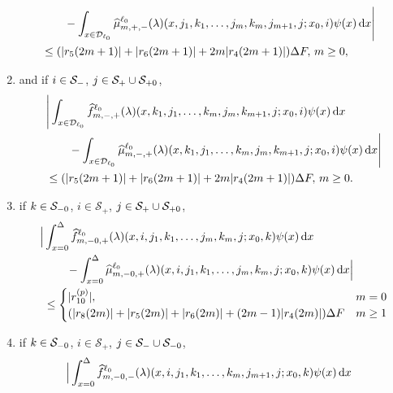 \begin{cor}
\begin{enumerate}
\begin{align}
	\\&\qquad{}- \int_{x\in\mathcal{D}_{\ell_0}}\widehat \mu^{\ell_0}_{m,+,-}(\lambda)(x,j_1,k_1,\dots,j_m,k_m,j_{m+1},j; x_0,i)\psi(x)\, \mathrm{d} x\Bigg| \nonumber
                	\\&\leq 
			(|r_5(2m+1)| + |r_6(2m+1)| + 2m|r_4(2m+1)|)\Delta F ,\,   m\geq 0,\label{eqn: +-}
	\end{align}
	\item and if \(i\in\mathcal{S}_{-}\), \(j\in\mathcal{S}_+\cup\mathcal{S}_{+0}\),
	\begin{align}
                	&\Bigg|\int_{x\in\mathcal{D}_{\ell_0}}\widehat f^{\ell_0}_{m,-,+}(\lambda)(x,k_1,j_1,\dots,k_m,j_m,k_{m+1},j; x_0,i)\psi(x)\, \mathrm{d} x \nonumber
	\\&\qquad{} - \int_{x\in\mathcal{D}_{\ell_0}}\widehat \mu^{\ell_0}_{m,-,+}(\lambda)(x,k_1,j_1,\dots,k_m,j_m,k_{m+1},j; x_0,i)\psi(x)\, \mathrm{d} x\Bigg| \nonumber
                	\\&\leq 
			(|r_5(2m+1)| + |r_6(2m+1)| + 2m|r_4(2m+1)|)\Delta F,\,    m\geq 0.\label{eqn: -+}
	\end{align}
%
	\item  if \(k\in\mathcal{S}_{-0}\), \(i\in\mathcal S_+\), \(j\in\mathcal{S}_+\cup\mathcal{S}_{+0}\), 
	\begin{align}
                	\Big|&\int_{x=0}^\Delta \widehat{f}_{m,-0,+}^{\ell_0}(\lambda)(x,i,j_1,k_1,\dots,j_m,k_m,j;x_0,k)\psi(x) \, \mathrm{d} x\nonumber 
		\\&\qquad{} -\int_{x=0}^\Delta \widehat \mu_{m,-0,+}^{\ell_0}(\lambda)(x,i,j_1,k_1,\dots,j_m,k_m,j;x_0,k)\psi(x)\, \mathrm{d} x \Big| \nonumber
	\\&\leq \begin{cases} |r_{10}^{(p)}|, & m=0 \\ (|r_8(2m)|+|r_5(2m)|+|r_6(2m)| + (2m-1)|r_4(2m)|)\Delta F & m \geq 1 \end{cases}  \label{eqn: MMv}
	\end{align}
	\item {if \(k\in\mathcal{S}_{-0}\), \(i\in\mathcal S_+\), \(j\in\mathcal{S}_-\cup\mathcal{S}_{-0}\), }
	\begin{align}
                	&\Big|\int_{x=0}^\Delta \widehat{f}_{m,-0,-}^{\ell_0}(\lambda)(x,i,j_1,k_1,\dots,k_m,j_{m+1},j;x_0,k)\psi(x)\wrt x\nonumber 

\end{align}
\end{enumerate}
\end{cor}
